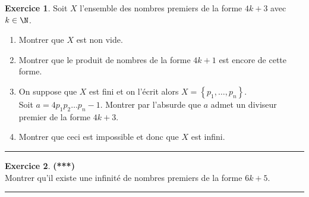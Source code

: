 \documentclass[a4paper,11pt]{article}
\theoremstyle{definition}
\newtheorem{exo}{Exercice} %
\begin{document}
\begin{minipage}{1\linewidth}
\begin{minipage}[t]{0.48\linewidth}
\begin{exo}
			Soit $X$ l'ensemble des nombres premiers de la forme $4k + 3$ avec $k \in \N$.
			\begin{enumerate}
				\item Montrer que $X$ est non vide.
				\item Montrer que le produit de nombres de la forme $4k + 1$ est encore de cette forme.
				\item On suppose que $X$ est fini et on l'\'ecrit alors $X = \left\{
				p_1, \ldots, p_n\right\}$.\\  Soit $a = 4p_1 p_2 \ldots p_n  - 1$. Montrer par l'absurde
				que $a$ admet un diviseur premier de la forme $4k + 3$.
				\item Montrer que ceci est impossible et donc que $X$ est infini.
			\end{enumerate}
			
			\centering
			\rule{1\linewidth}{0.6pt}
		\end{exo}
	
		
		
		\begin{exo}\textbf{(***)}\quad\\[0.2cm]
			Montrer qu'il existe une infinité de nombres premiers de la forme $6k+5$.
			
			\centering
			\rule{1\linewidth}{0.6pt}
		\end{exo}
		

		
	\end{minipage}
\end{minipage}
	
\end{document}

